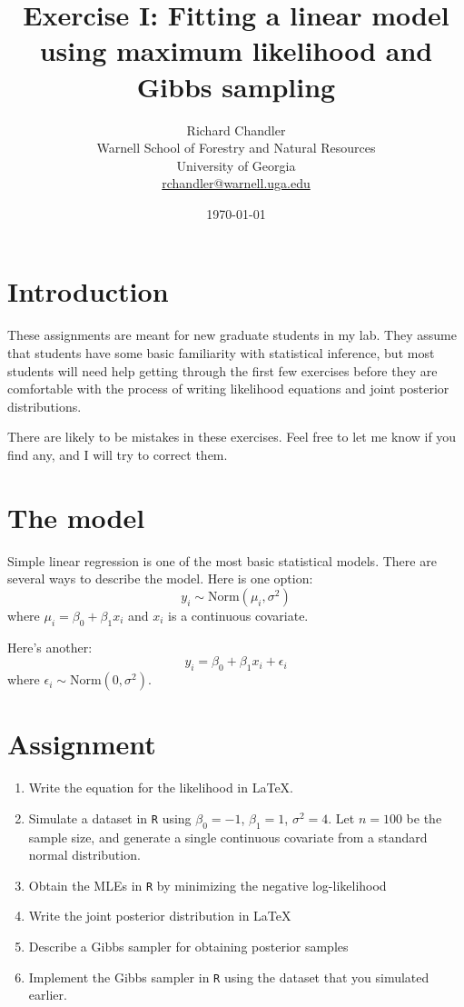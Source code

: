 \documentclass[11pt]{article}
\begin{document}
\title{Exercise I: Fitting a linear model using maximum likelihood and
  Gibbs sampling} 
\author{Richard Chandler \\ Warnell School of Forestry and Natural
  Resources \\ University of Georgia \\ \href{mailto:rchandler@warnell.uga.edu}{rchandler@warnell.uga.edu}
}
\date{\today}

\maketitle


\section*{Introduction}

These assignments are meant for new graduate students in my lab. They
assume that students have some basic familiarity with statistical
inference, but most students will need help getting through the first
few exercises before they are comfortable with the process of writing
likelihood equations and joint posterior distributions. 

There are likely to be mistakes in these exercises. Feel free to let
me know if you find any, and I will try to correct them.


\section*{The model}

Simple linear regression is one of the most basic statistical
models. There are several ways to describe the model. Here is one
option: 
\[
  y_i \sim \mathrm{Norm}(\mu_i,\sigma^2)
\]
where $\mu_i = \beta_0 + \beta_1 x_i$ and $x_i$ is a continuous covariate. 

Here's another:
\[
  y_i = \beta_0 + \beta_1 x_i + \epsilon_i
\]
where $\epsilon_i \sim \mathrm{Norm}(0, \sigma^2)$.

\section*{Assignment}


\begin{enumerate}
  \item Write the equation for the likelihood in \LaTeX.
  \item Simulate a dataset in {\tt R} using $\beta_0=-1$, $\beta_1=1$,
    $\sigma^2=4$. Let $n=100$ be the sample size, and generate a
    single continuous covariate from a standard normal distribution.
  \item Obtain the MLEs in {\tt R} by minimizing the negative log-likelihood
  \item Write the joint posterior distribution in \LaTeX
  \item Describe a Gibbs sampler for obtaining posterior samples
  \item Implement the Gibbs sampler in {\tt R} using the dataset that
    you simulated earlier.
\end{enumerate}
\end{document}
